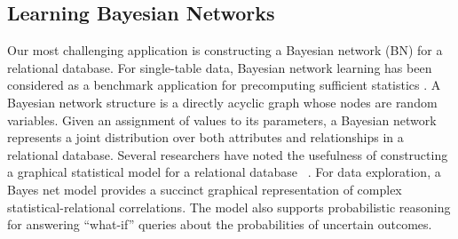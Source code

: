 \documentclass{sig-alternate-2013}
\begin{document}
%



%
%
%

\subsection{Learning Bayesian Networks}

Our most challenging application is constructing a Bayesian network (BN) for a relational database. For single-table data, Bayesian network learning has been considered as a benchmark application for precomputing sufficient statistics \cite{Moore1998,lv2012}. A Bayesian network structure is a directly acyclic graph whose nodes are random variables. Given an assignment of values to its parameters, a Bayesian network represents a joint distribution over both attributes and relationships in a relational database. Several researchers have noted the usefulness of constructing a graphical statistical model for a relational database ~\cite{Graepel_CIKM13,Wang2008}.
For data exploration, a Bayes net  model provides a succinct graphical representation of complex statistical-relational correlations. The model also supports probabilistic reasoning for answering ``what-if'' queries about the probabilities of uncertain outcomes. 
\end{document}
